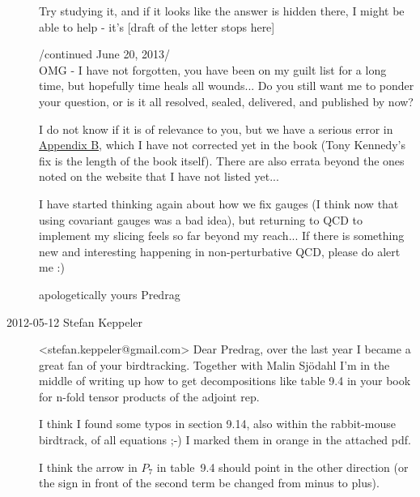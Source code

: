 \begin{description}
Try studying it, and if it looks like the answer is hidden there, I might be
able to help - it's [draft of the letter stops here]

                          /continued June 20, 2013/\\
OMG - I have not forgotten, you have been on my guilt list for a long time,
but hopefully time heals all wounds... Do you still want me to ponder your
question, or is it all resolved, sealed, delivered, and published by now?

I do not know if it is of relevance to you, but we have a serious error in
\href{http://birdtracks.eu/extras/reviews.html}{Appendix B}, which I have not
corrected yet in the book (Tony Kennedy's fix is the length of the book
itself). There are also errata beyond the ones noted on the website that I
have not listed yet...

I have started thinking again about how we fix gauges (I think now that using
covariant gauges was a bad idea), but returning to QCD to implement my
slicing feels so far beyond my reach... If there is something new and
interesting happening in non-perturbative QCD, please do alert me :)

apologetically yours
Predrag


\item[2012-05-12 Stefan Keppeler] <stefan.keppeler@gmail.com>
Dear Predrag,
over the last year I became a great fan of your birdtracking. Together
with Malin Sj{\"o}dahl I'm in the middle of writing up how to get
decompositions like table 9.4 in your book for n-fold tensor products
of the adjoint rep.

I think I found some typos in section 9.14, also within the rabbit-mouse
birdtrack, of all equations ;-) I marked them in orange in the
 {attached pdf}.

I think the arrow in $P_7$ in table~9.4 should point in the other direction
(or the sign in front of the second term be changed from minus to plus).


\end{description}
